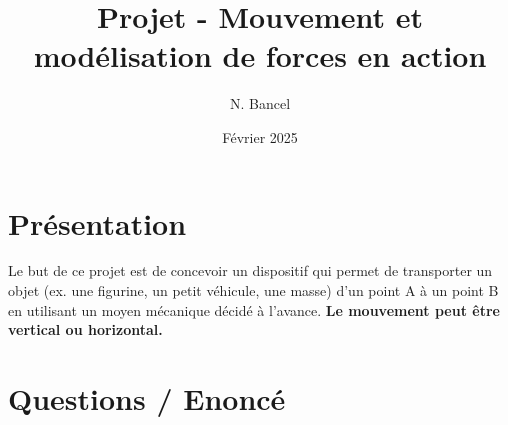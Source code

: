 \documentclass[a4paper,12pt]{article}
\begin{document}
\title{Projet - Mouvement et modélisation de forces en action}
\author{N. Bancel}
\date{Février 2025}
\maketitle

\section*{Présentation}

Le but de ce projet est de concevoir un dispositif qui permet de transporter un objet
(ex. une figurine, un petit véhicule, une masse) d'un point A à un point B en utilisant un moyen mécanique décidé à l'avance.
\textbf{Le mouvement peut être vertical ou horizontal.}

\section*{Questions / Enoncé}
\end{document}
